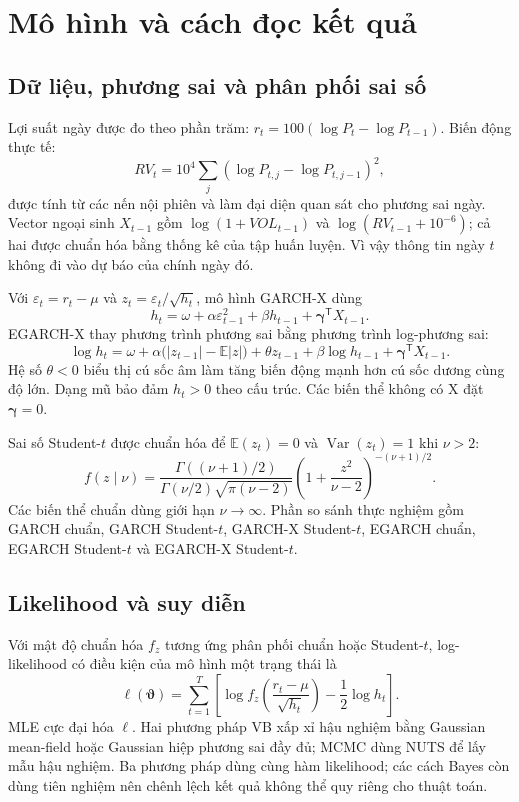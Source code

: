 \documentclass[11pt,a4paper]{article}
\begin{document}
\section{Mô hình và cách đọc kết quả}
\subsection{Dữ liệu, phương sai và phân phối sai số}
Lợi suất ngày được đo theo phần trăm: $r_t=100(\log P_t-\log P_{t-1})$.
Biến động thực tế: $$RV_t=10^4\sum_j(\log P_{t,j}-\log P_{t,j-1})^2,$$
được tính từ các nến nội phiên và làm đại diện quan sát cho phương sai ngày.
Vector ngoại sinh $X_{t-1}$ gồm $\log(1+VOL_{t-1})$ và
$\log(RV_{t-1}+10^{-6})$; cả hai được chuẩn hóa bằng thống kê của tập huấn luyện.
Vì vậy thông tin ngày $t$ không đi vào dự báo của chính ngày đó.

Với $\varepsilon_t=r_t-\mu$ và $z_t=\varepsilon_t/\sqrt{h_t}$, mô hình
GARCH-X dùng
\begin{equation}\label{eq:garchx}
h_t=\omega+\alpha\varepsilon_{t-1}^{2}+\beta h_{t-1}
       +\boldsymbol\gamma^{\mathsf T}X_{t-1}.
\end{equation}
EGARCH-X thay phương trình phương sai bằng phương trình log-phương sai:
\begin{equation}\label{eq:egarchx}
\log h_t=\omega+\alpha\bigl(|z_{t-1}|-\mathbb E|z|\bigr)
       +\theta z_{t-1}+\beta\log h_{t-1}
       +\boldsymbol\gamma^{\mathsf T}X_{t-1}.
\end{equation}
Hệ số $\theta<0$ biểu thị cú sốc âm làm tăng biến động mạnh hơn cú sốc dương
cùng độ lớn. Dạng mũ bảo đảm $h_t>0$ theo cấu trúc. Các biến thể không có X
đặt $\boldsymbol\gamma=0$.

Sai số Student-$t$ được chuẩn hóa để $\mathbb E(z_t)=0$ và
$\operatorname{Var}(z_t)=1$ khi $\nu>2$:
\begin{equation}\label{eq:student}
f(z\mid\nu)=\frac{\Gamma((\nu+1)/2)}
 {\Gamma(\nu/2)\sqrt{\pi(\nu-2)}}
 \left(1+\frac{z^2}{\nu-2}\right)^{-(\nu+1)/2}.
\end{equation}
Các biến thể chuẩn dùng giới hạn $\nu\to\infty$. Phần so sánh thực nghiệm
gồm GARCH chuẩn, GARCH Student-$t$, GARCH-X Student-$t$, EGARCH chuẩn,
EGARCH Student-$t$ và EGARCH-X Student-$t$.

\subsection{Likelihood và suy diễn}
Với mật độ chuẩn hóa $f_z$ tương ứng phân phối chuẩn hoặc Student-$t$,
log-likelihood có điều kiện của mô hình một trạng thái là
\begin{equation}\label{eq:likelihood}
\ell(\boldsymbol\vartheta)=\sum_{t=1}^{T}
\left[\log f_z\left(\frac{r_t-\mu}{\sqrt{h_t}}\right)-\frac12\log h_t\right].
\end{equation}
MLE cực đại hóa $\ell$. Hai phương pháp VB xấp xỉ hậu nghiệm bằng Gaussian
mean-field hoặc Gaussian hiệp phương sai đầy đủ; MCMC dùng NUTS để lấy mẫu
hậu nghiệm. Ba phương pháp dùng cùng hàm likelihood; các cách Bayes còn dùng
tiên nghiệm nên chênh lệch kết quả không thể quy riêng cho thuật toán.
\end{document}
